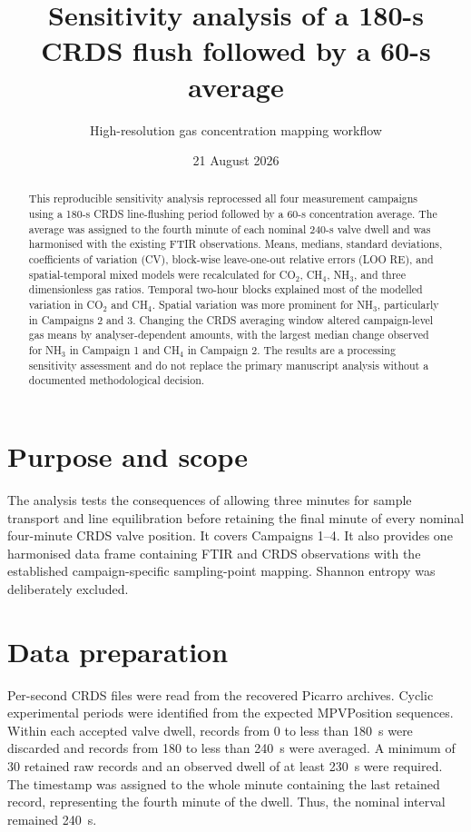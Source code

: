\documentclass[11pt,a4paper]{article}
\title{Sensitivity analysis of a 180-s CRDS flush followed by a 60-s average}
\author{High-resolution gas concentration mapping workflow}
\date{21 August 2026}
\begin{document}
\maketitle

\begin{abstract}
This reproducible sensitivity analysis reprocessed all four measurement campaigns using a 180-s CRDS line-flushing period followed by a 60-s concentration average. The average was assigned to the fourth minute of each nominal 240-s valve dwell and was harmonised with the existing FTIR observations. Means, medians, standard deviations, coefficients of variation (CV), block-wise leave-one-out relative errors (LOO RE), and spatial-temporal mixed models were recalculated for CO$_2$, CH$_4$, NH$_3$, and three dimensionless gas ratios. Temporal two-hour blocks explained most of the modelled variation in CO$_2$ and CH$_4$. Spatial variation was more prominent for NH$_3$, particularly in Campaigns 2 and 3. Changing the CRDS averaging window altered campaign-level gas means by analyser-dependent amounts, with the largest median change observed for NH$_3$ in Campaign 1 and CH$_4$ in Campaign 2. The results are a processing sensitivity assessment and do not replace the primary manuscript analysis without a documented methodological decision.
\end{abstract}

\section{Purpose and scope}

The analysis tests the consequences of allowing three minutes for sample transport and line equilibration before retaining the final minute of every nominal four-minute CRDS valve position. It covers Campaigns 1--4. It also provides one harmonised data frame containing FTIR and CRDS observations with the established campaign-specific sampling-point mapping. Shannon entropy was deliberately excluded.

\section{Data preparation}

Per-second CRDS files were read from the recovered Picarro archives. Cyclic experimental periods were identified from the expected MPVPosition sequences. Within each accepted valve dwell, records from 0 to less than 180~s were discarded and records from 180 to less than 240~s were averaged. A minimum of 30 retained raw records and an observed dwell of at least 230~s were required. The timestamp was assigned to the whole minute containing the last retained record, representing the fourth minute of the dwell. Thus, the nominal interval remained 240~s.
\end{document}
